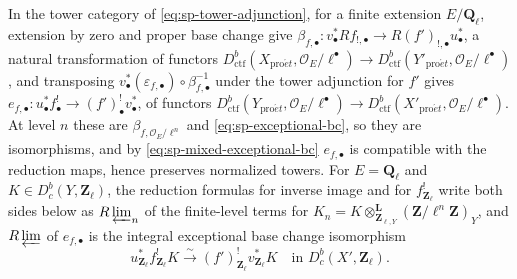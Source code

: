 \documentclass[11pt,a4paper]{article}
\numberwithin{equation}{section}
\theoremstyle{definition}
\theoremstyle{remark}
\newcommand{\Dbc}{D^b_c}
\newcommand{\Ql}{\mathbf Q_\ell}
\newcommand{\Zl}{\mathbf Z_\ell}
\newcommand{\proet}{\mathrm{pro}\acute{e}t}
\newcommand{\Dctf}{D^b_{\mathrm{ctf}}}
\begin{document}
In the tower category of \eqref{eq:sp-tower-adjunction}, for a finite
extension $E/\Ql$, extension by zero and proper base change give
$\beta_{f,\bullet}:v_\bullet^*Rf_{!,\bullet}\to R(f')_{!,\bullet}u_\bullet^*$,
a natural transformation of functors
$\Dctf(X_{\proet},\mathcal O_E/\ell^\bullet)\to\Dctf(Y'_{\proet},\mathcal O_E/\ell^\bullet)$,
and transposing $v_\bullet^*(\varepsilon_{f,\bullet})\circ\beta_{f,\bullet}^{-1}$
under the tower adjunction for $f'$ gives
$e_{f,\bullet}:u_\bullet^*f_\bullet^!\to(f')_\bullet^!v_\bullet^*$, of functors
$\Dctf(Y_{\proet},\mathcal O_E/\ell^\bullet)\to\Dctf(X'_{\proet},\mathcal O_E/\ell^\bullet)$. At
level $n$ these are $\beta_{f,\mathcal O_E/\ell^n}$ and
\eqref{eq:sp-exceptional-bc}, so they are isomorphisms, and by
\eqref{eq:sp-mixed-exceptional-bc} $e_{f,\bullet}$ is compatible with
the reduction maps, hence preserves normalized towers. For $E=\Ql$ and
$K\in\Dbc(Y,\Zl)$, the reduction formulas for inverse
image and for $f^!_{\Zl}$ write both sides below as $R\varprojlim_n$ of
the finite-level terms for $K_n=K\otimes^{\mathbf L}_{\mathbf Z_{\ell,Y}}
(\mathbf Z/\ell^n\mathbf Z)_Y$, and $R\varprojlim$ of $e_{f,\bullet}$ is the
integral exceptional base change isomorphism
\begin{equation}\label{eq:sp-integral-bc}
 u_{\Zl}^{*}f_{\Zl}^{!}K
       \xrightarrow{\sim}(f')_{\Zl}^{!}v_{\Zl}^{*}K
       \quad\text{in }\Dbc(X',\Zl).
\end{equation}
\end{document}
